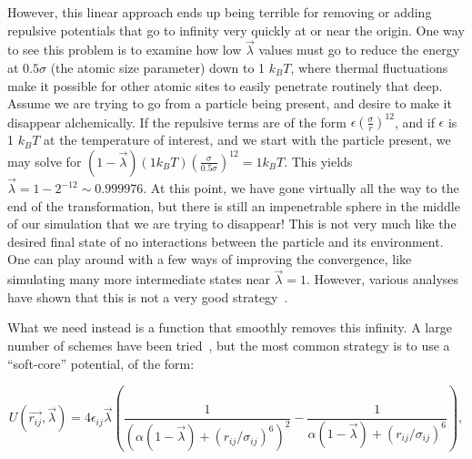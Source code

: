 \documentclass[9pt,bestpractices]{livecoms}
\begin{document}
However, this linear approach ends up being terrible for removing or adding repulsive potentials that go to infinity very quickly at or near the origin. One way to see this problem is to examine how low $\vec{\lambda}$ values must go to reduce the energy at $0.5\sigma$ (the atomic size parameter) down to 1 $k_BT$, where thermal fluctuations make it possible for other atomic sites to easily penetrate routinely that deep. Assume we are trying to go from a particle being present, and desire to make it disappear alchemically. If the repulsive terms are of the form $\epsilon(\frac{\sigma}{r})^{12}$, and if $\epsilon$ is 1 $k_BT$ at the temperature of interest, and we start with the particle present, we may solve for $(1-\vec{\lambda})(1 k_B T)\left(\frac{\sigma}{0.5\sigma}\right)^{12} = 1 k_B T$. This yields $\vec{\lambda} = 1-2^{-12} \sim 0.999976$. At this point,  we have gone virtually all the way to the end of the transformation, but there is still an impenetrable sphere in the middle of our simulation that we are trying to disappear! This is not very much like the desired final state of no interactions between the particle and its environment. One can play around with a few ways of improving the convergence, like simulating many more intermediate states near $\vec{\lambda}=1$. However, various analyses have shown that this is not a very good strategy~\cite{pham2011identifying, beutler1994avoiding, zacharias1994separationshifted, blondel2004ensemble, gapsys2012new}.

What we need instead is a function that smoothly removes this infinity. A large number of schemes have been tried~\cite{beutler1994avoiding, zacharias1994separationshifted, blondel2004ensemble, pham2011identifying, pham2012optimal, naden2014linear, donnini2005incorporating,isthereagapsysone?}, but the most common strategy is to use a ``soft-core'' potential, of the form:

\begin{equation}
    U(\vec{r_{ij}},\vec{\lambda}) = 4\epsilon_{ij} \vec{\lambda} \left(\frac{1}{(\alpha(1-\vec{\lambda}) + (r_{ij}/\sigma_{ij})^6)^2} -  \frac{1}{\alpha(1-\vec{\lambda}) + (r_{ij}/\sigma_{ij})^6}\right)
    \label{eq:softcore},
\end{equation}
\end{document}
